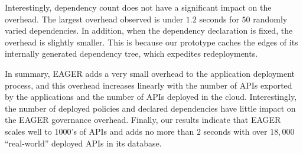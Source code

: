 Interestingly, dependency count does not have a significant impact on 
the overhead.  The largest overhead observed is under $1.2$ seconds
for $50$ randomly varied dependencies.
In addition, when the dependency declaration is fixed, the overhead is slightly smaller. 
This is because our prototype caches the edges of its internally generated dependency tree, 
which expedites redeployments.

In summary, EAGER adds a very small overhead to the application deployment
process, and 
this overhead increases linearly with the number of APIs exported by the applications
and the number of APIs deployed in the cloud. 
Interestingly, the number of deployed policies and declared dependencies
have little impact on the EAGER governance overhead. 
Finally, our results indicate that EAGER scales 
well to $1000$'s of APIs and adds no more than $2$ seconds with over
$18,000$ ``real-world'' deployed APIs in its database.
